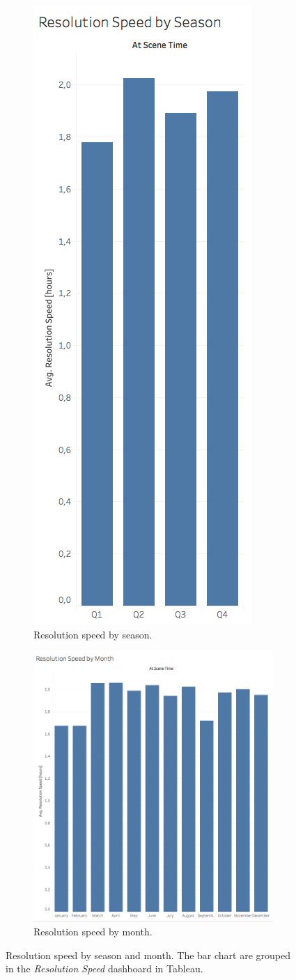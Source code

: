 \begin{figure}[h!]
    \begin{subfigure}{0.45\textwidth}
        \centering
        \includegraphics[width=0.342\linewidth]{figures/3_3_resolution_speed_by_season} 
        \caption{Resolution speed by season.}
        \label{fig:3_3_resolution_speed_by_season}
    \end{subfigure}
    \begin{subfigure}{0.55\textwidth}
        \centering
        \includegraphics[width=0.7\linewidth]{figures/3_3_resolution_speed_by_month}
        \caption{Resolution speed by month.}
        \label{fig:3_3_resolution_speed_by_month}
    \end{subfigure}
    \caption{Resolution speed by season and month. The bar chart are grouped in the \textit{Resolution Speed} dashboard in Tableau.}
    \label{fig:3_3_resolution_speed_by_season_and_month}
\end{figure}
